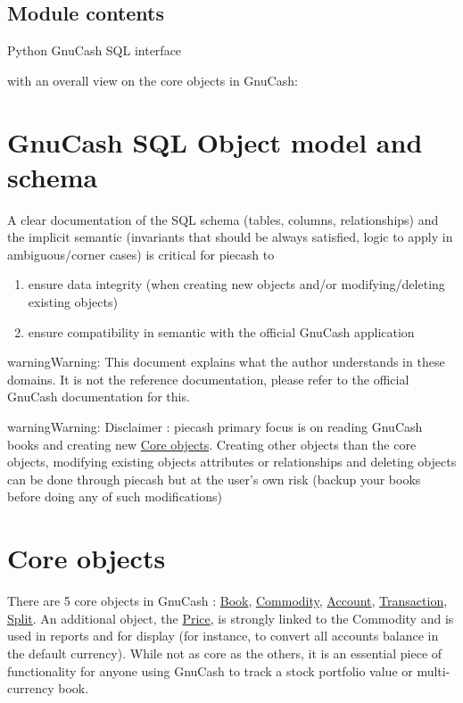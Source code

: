 \documentclass[letterpaper,10pt,english]{sphinxmanual}
\begin{document}
\subsection{Module contents}
\label{api/piecash:module-contents}\label{api/piecash:module-piecash}
Python GnuCash SQL interface

with an overall view on the core objects in GnuCash:


\section{GnuCash SQL Object model and schema}
\label{object_model::doc}\label{object_model:gnucash-sql-object-model-and-schema}
A clear documentation of the SQL schema (tables, columns, relationships) and the implicit semantic (invariants that should
be always satisfied, logic to apply in ambiguous/corner cases) is critical for piecash to
\begin{enumerate}
\item {} 
ensure data integrity (when creating new objects and/or modifying/deleting existing objects)

\item {} 
ensure compatibility in semantic with the official GnuCash application

\end{enumerate}

\begin{notice}{warning}{Warning:}
This document explains what the author understands in these domains. It is not the reference documentation, please refer
to the official GnuCash documentation for this.
\end{notice}

\begin{notice}{warning}{Warning:}
Disclaimer : piecash primary focus is on reading GnuCash books and creating new {\hyperref[object_model:core-objects]{Core objects}}.
Creating other objects than the core objects, modifying existing objects attributes or relationships and deleting
objects can be done through piecash but at the user's own risk (backup your books before doing any of such modifications)
\end{notice}


\section{Core objects}
\label{object_model:core-objects}
There are 5 core objects in GnuCash  : {\hyperref[object_model:book]{Book}}, {\hyperref[object_model:commodity]{Commodity}}, {\hyperref[object_model:account]{Account}}, {\hyperref[object_model:transaction]{Transaction}}, {\hyperref[object_model:split]{Split}}.
An additional object, the {\hyperref[object_model:price]{Price}}, is strongly linked to the Commodity and is used in reports and for display (for instance, to convert all accounts balance
in the default currency). While not as core as the others, it is an essential piece of functionality for anyone using
GnuCash to track a stock portfolio value or multi-currency book.
\end{document}
